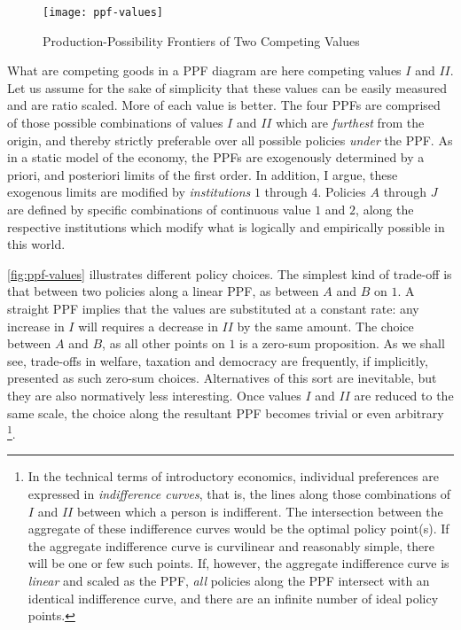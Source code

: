 \begin{figure}[htbp]
	\centering
	\texttt{[image: ppf-values]}
	\caption{Production-Possibility Frontiers of Two Competing Values}
	\label{fig:ppf-values}
\end{figure}%

	What are competing goods in a \gls{PPF} diagram are here competing values $I$ and $II$.
	Let us assume for the sake of simplicity that these values can be easily measured and are ratio scaled.
	More of each value is better.
	The four \glspl{PPF} are comprised of those possible combinations of values $I$ and $II$ which are \emph{furthest} from the origin, and thereby strictly preferable over all possible policies \emph{under} the \gls{PPF}.
	As in a static model of the economy, the \glspl{PPF} are exogenously determined by a priori, and posteriori limits of the first order.
	In addition, I argue, these exogenous limits are modified by \emph{institutions} $1$ through $4$.
	 Policies $A$ through $J$ are defined by specific combinations of continuous value $1$ and $2$, along the respective institutions which modify what is logically and empirically possible in this world.

	\autoref{fig:ppf-values} illustrates different policy choices.
	The simplest kind of trade-off is that between two policies along a linear \gls{PPF}, as between $A$ and $B$ on $1$.
	A straight \gls{PPF} implies that the values are substituted at a constant rate: any increase in $I$ will requires a decrease in $II$ by the same amount.
	The choice between $A$ and $B$, as all other points on $1$ is a zero-sum proposition.
	As we shall see, trade-offs in welfare, taxation and democracy are frequently, if implicitly, presented as such zero-sum choices.
	Alternatives of this sort are inevitable, but they are also normatively less interesting.
	Once values $I$ and $II$ are reduced to the same scale, the choice along the resultant \gls{PPF} becomes trivial or even arbitrary
	\footnote{
		In the technical terms of introductory economics, individual preferences are expressed in \emph{indifference curves}, that is, the lines along those combinations of $I$ and $II$ between which a person is indifferent.
		The intersection between the aggregate of these indifference curves would be the optimal policy point(s). %
		If the aggregate indifference curve is curvilinear and reasonably simple, there will be one or few such points.
		If, however, the aggregate indifference curve is \emph{linear} and scaled as the \gls{PPF}, \emph{all} policies along the \gls{PPF} intersect with an identical indifference curve, and there are an infinite number of ideal policy points.
	}.%


